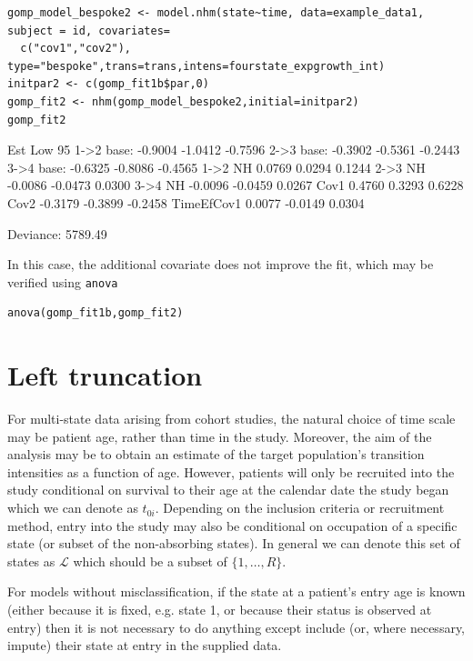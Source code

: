 \documentclass{article}
\numberwithin{equation}{section}
\begin{document}
\begin{verbatim}
gomp_model_bespoke2 <- model.nhm(state~time, data=example_data1, subject = id, covariates=
  c("cov1","cov2"), type="bespoke",trans=trans,intens=fourstate_expgrowth_int)
initpar2 <- c(gomp_fit1b$par,0)
gomp_fit2 <- nhm(gomp_model_bespoke2,initial=initpar2)
gomp_fit2
\end{verbatim}
\begin{verbout}
               Est Low 95%
1->2 base: -0.9004 -1.0412 -0.7596
2->3 base: -0.3902 -0.5361 -0.2443
3->4 base: -0.6325 -0.8086 -0.4565
1->2 NH     0.0769  0.0294  0.1244
2->3 NH    -0.0086 -0.0473  0.0300
3->4 NH    -0.0096 -0.0459  0.0267
Cov1        0.4760  0.3293  0.6228
Cov2       -0.3179 -0.3899 -0.2458
TimeEfCov1  0.0077 -0.0149  0.0304

Deviance: 5789.49
\end{verbout}
In this case, the additional covariate does not improve the fit, which may be verified using \verb!anova!
\begin{verbatim}
anova(gomp_fit1b,gomp_fit2)
\end{verbatim}

\section{Left truncation}
\label{sec_left_trunc}

For multi-state data arising from cohort studies, the natural choice of time scale may be patient age, rather than time in the study. Moreover, the aim of the analysis may be to obtain an estimate of the target population's transition intensities as a function of age. However, patients will only be recruited into the study conditional on survival to their age at the calendar date the study began which we can denote as $t_{0i}$. Depending on the inclusion criteria or recruitment method, entry into the study may also be conditional on occupation of a specific state (or subset of the non-absorbing states). In general we can denote this set of states as $$ which should be a subset of $\{1,\ldots,R\}$.

For models without misclassification, if the state at a patient's entry age is known (either because it is fixed, e.g. state 1, or because their status is observed at entry) then it is not necessary to do anything except include (or, where necessary, impute) their state at entry in the supplied data. 
\end{document}
